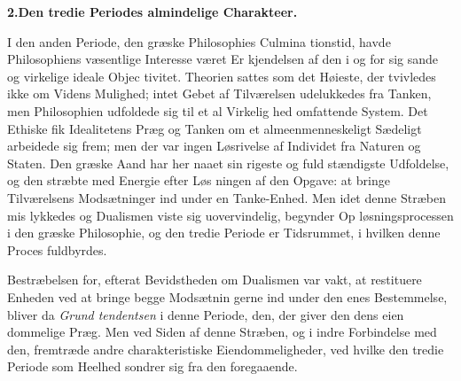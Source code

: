 \documentclass[12pt,a4paper]{book}
\begin{document}
\begin{center}
\textbf{2.\enspace Den tredie Periodes almindelige Charakteer.}
\end{center}
I den anden Periode, den græske Philosophies Culmina\-%
tionstid, havde Philosophiens væsentlige Interesse været Er\-%
kjendelsen af den i og for sig sande og virkelige ideale Objec\-%
tivitet. Theorien sattes som det Høieste, der tvivledes ikke
om Videns Mulighed; intet Gebet af Tilværelsen udelukkedes
fra Tanken, men Philosophien udfoldede sig til et al Virkelig\-%
hed omfattende System. Det Ethiske fik Idealitetens Præg og
Tanken om et almeenmenneskeligt Sædeligt arbeidede sig frem;
men der var ingen Løsrivelse af Individet fra Naturen og
Staten. Den græske Aand har her naaet sin rigeste og fuld\-%
stændigste Udfoldelse, og den stræbte med Energie efter Løs\-%
ningen af den Opgave: at bringe Tilværelsens Modsætninger
ind under en Tanke-Enhed. Men idet denne Stræben mis\-%
lykkedes og Dualismen viste sig uovervindelig, begynder Op\-%
løsningsprocessen i den græske Philosophie, og den tredie
Periode er Tidsrummet, i hvilken denne Proces fuldbyrdes.

Bestræbelsen for, efterat Bevidstheden om Dualismen var
vakt, at restituere Enheden ved at bringe begge Modsætnin\-%
gerne ind under den enes Bestemmelse, bliver da \emph{Grund\-%
tendentsen} i denne Periode, den, der giver den dens eien\-%
dommelige Præg. Men ved Siden af denne Stræben, og i
indre Forbindelse med den, fremtræde andre charakteristiske
Eiendommeligheder, ved hvilke den tredie Periode som Heelhed
sondrer sig fra den foregaaende.
\end{document}
